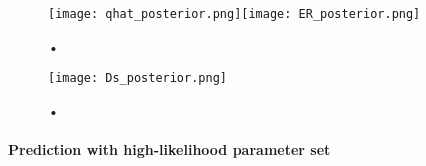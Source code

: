 \begin{figure}
\centering
\texttt{[image: qhat\_posterior.png]}\texttt{[image: ER\_posterior.png]}
\caption{•}
\label{fig:new:posterior-qhat}
\end{figure}


\begin{figure}
\centering
\texttt{[image: Ds\_posterior.png]}
\caption{•}
\label{fig:new:posterior-Ds}
\end{figure}

\paragraph{Prediction with high-likelihood parameter set}

